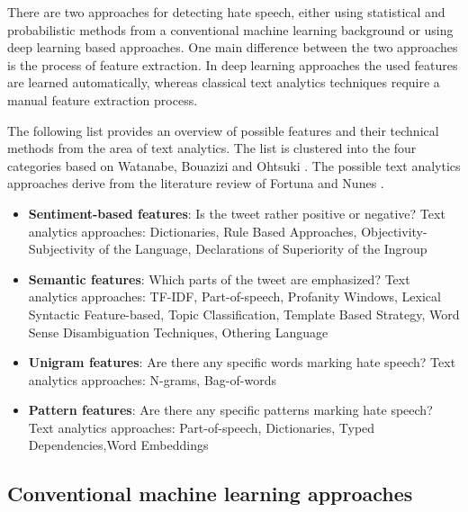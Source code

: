 There are two approaches for detecting hate speech, either using statistical and probabilistic methods from a conventional machine learning background or using deep learning based approaches. One main difference between the two approaches is the process of feature extraction. In deep learning approaches the used features are learned automatically, whereas classical text analytics techniques require a manual feature extraction process.

\noindent
The following list provides an overview of possible features and their technical methods from the area of text analytics. The list is clustered into the four categories based on Watanabe, Bouazizi and Ohtsuki \cite{Watanabe.2018}. The possible text analytics approaches derive from the literature review of Fortuna and Nunes \cite{Fortuna.2018}.
\begin{itemize}
	\item \textbf{Sentiment-based features}: Is the tweet rather positive or negative? \newline
	Text analytics approaches: Dictionaries, Rule Based Approaches, Ob\-jec\-ti\-vi\-ty-Subjectivity of the Language, Declarations of Superiority of the Ingroup \cite{Fortuna.2018}
	\item \textbf{Semantic features}: Which parts of the tweet are emphasized? \newline
	Text analytics approaches: TF-IDF, Part-of-speech, Profanity Windows, Lexical Syntactic Feature-based, Topic Classification, Template Based Strategy, Word Sense Disambiguation Techniques, Othering Language \cite{Fortuna.2018}
	\item \textbf{Unigram features}: Are there any specific words marking hate speech? \newline
	Text analytics approaches: N-grams, Bag-of-words \cite{Fortuna.2018}
	\item \textbf{Pattern features}: Are there any specific patterns marking hate speech? \newline
	Text analytics approaches: Part-of-speech, Dictionaries, Typed De\-pen\-den\-cies,Word Embeddings \cite{Fortuna.2018}
\end{itemize}


\subsection{Conventional machine learning approaches}

